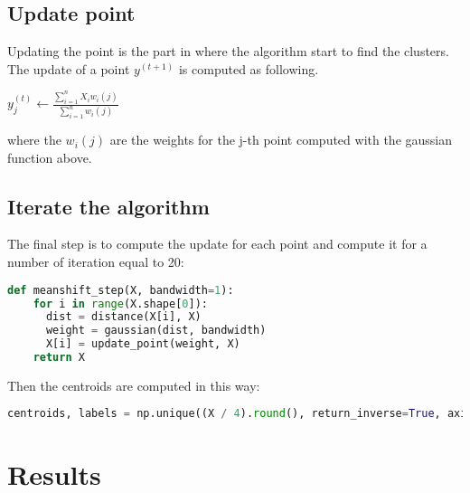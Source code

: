 \documentclass{ETHExercise}
\begin{document}
\subsection{Update point}
Updating the point is the part in where the algorithm start to find the clusters.
The update of a point $y^{(t+1)}$ is computed as following.

\begin{center}
  $y_j^{(t)} \leftarrow \frac{\sum\limits_{i=1}^{n}X_i w_i(j)}{\sum\limits_{i=1}^{n}w_i(j)}$
\end{center}

where the $w_i(j)$ are the weights for the j-th point computed with the gaussian function above.

\subsection{Iterate the algorithm}

The final step is to compute the update for each point and compute it for a number of iteration 
equal to 20:

\begin{lstlisting}[language=Python, caption=Mean-shift]
  def meanshift_step(X, bandwidth=1):
    for i in range(X.shape[0]):
      dist = distance(X[i], X)
      weight = gaussian(dist, bandwidth)
      X[i] = update_point(weight, X)
    return X
\end{lstlisting}

Then the centroids are computed in this way:
\begin{lstlisting}[language=Python, caption=Centroids]
  centroids, labels = np.unique((X / 4).round(), return_inverse=True, axis=0)
\end{lstlisting}

\section{Results}
\end{document}
